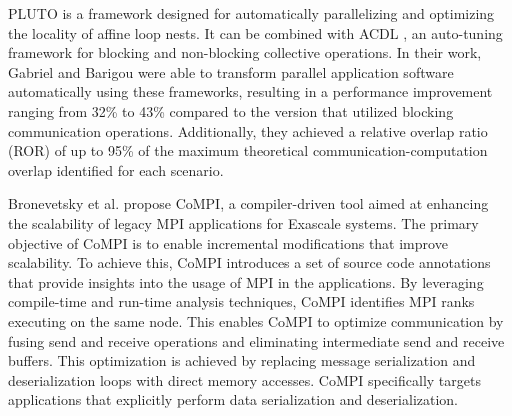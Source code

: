 PLUTO \cite{noauthor_pluto_nodate} is a framework designed for automatically parallelizing and optimizing the locality of affine loop nests. It can be combined with ACDL \cite{frohn_adcl_2023}, an auto-tuning framework for blocking and non-blocking collective operations. In their work, Gabriel and Barigou \cite{barigou_maximizing_2017} were able to transform parallel application software automatically using these frameworks, resulting in a performance improvement ranging from 32\% to 43\% compared to the version that utilized blocking communication operations. 
Additionally, they achieved a relative overlap ratio (ROR) of up to 95\% of the maximum theoretical communication-computation overlap identified for each scenario.

Bronevetsky et al. \cite{lumsdaine_compiled_2013} propose CoMPI, a compiler-driven tool aimed at enhancing the scalability of legacy MPI applications for Exascale systems. The primary objective of CoMPI is to enable incremental modifications that improve scalability. To achieve this, CoMPI introduces a set of source code annotations that provide insights into the usage of MPI in the applications. By leveraging compile-time and run-time analysis techniques, CoMPI identifies MPI ranks executing on the same node. This enables CoMPI to optimize communication by fusing send and receive operations and eliminating intermediate send and receive buffers. This optimization is achieved by replacing message serialization and deserialization loops with direct memory accesses. CoMPI specifically targets applications that explicitly perform data serialization and deserialization.
